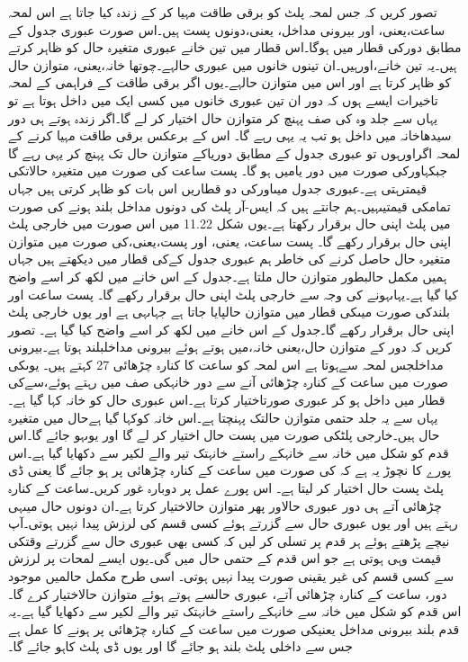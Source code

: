 	تصور کریں کہ جس لمحہ پلٹ کو برقی طاقت مہیا کر کے زندہ کیا جاتا ہے  اس لمحہ  ساعت،یعنی، اور بیرونی مداخل، یعنی،دونوں پست ہیں۔اس صورت عبوری جدول کے مطابق دورکی قطار میں ہوگا۔اس قطار میں تین خانے عبوری متغیرہ حال کو ظاہر کرتے ہیں۔یہ تین خانے،اورہیں۔ان تینوں خانوں میں عبوری حالہے۔چوتھا خانہ،یعنی، متوازن حال کو ظاہر کرتا ہے اور اس میں متوازن حالہے۔یوں اگر برقی طاقت کے فراہمی کے لمحہ تاخیرات ایسے ہوں کہ دور ان تین عبوری خانوں میں کسی ایک میں داخل ہوتا ہے تو یہاں سے جلد وہ کی صف پہنچ کر متوازن حال اختیار کر لے گا۔اگر زندہ ہوتے ہی دور سیدھاخانہ میں داخل ہو تب یہ یہی رہے گا۔
	اس کے برعکس برقی طاقت مہیا کرنے کے لمحہ اگراورہوں تو عبوری جدول کے مطابق دوریاکے متوازن حال تک پہنچ کر یہی رہے گا جبکہاورکی صورت میں دور یامیں ہو گا۔
	پست ساعت کی صورت میں متغیرہ حالاتکی قیمترہتی ہے۔عبوری جدول میںاورکی دو قطاریں اس بات کو ظاہر کرتی ہیں جہاں تمامکی قیمتیںہیں۔ہم جانتے ہیں کہ ایس-آر پلٹ کی دونوں مداخل بلند ہونے کی صورت میں پلٹ اپنی حال برقرار رکھتا ہے۔یوں شکل 11.22 میں اس صورت میں خارجی پلٹ اپنی حال برقرار رکھے گا۔
	پست ساعت، یعنی، اور پست،یعنی،کی صورت میں متوازن متغیرہ حال حاصل کرنے کی خاطر ہم عبوری جدول کےکی قطار میں دیکھتے ہیں جہاں ہمیں مکمل حالبطور متوازن حال ملتا ہے۔جدول کے اس خانے میں لکھ کر اسے واضح کیا گیا ہے۔یہاںہونے کی وجہ سے خارجی پلٹ اپنی حال برقرار رکھے گا۔
	پست ساعت اور بلندکی صورت میںکی قطار میں متوازن حالپایا جاتا ہے جہاںہی ہے اور یوں خارجی پلٹ اپنی حال برقرار رکھے گا۔جدول کے اس خانے میں لکھ کر اسے واضح کیا گیا ہے۔
	تصور کریں کہ دور کے متوازن حال،یعنی خانہ،میں ہوتے ہوئے بیرونی مداخلبلند ہوتا ہے۔بیرونی مداخلجس لمحہ سےہوتا ہے اس لمحہ کو ساعت کا کنارہ چڑھائی 27 کہتے ہیں۔ یوںکی صورت میں ساعت کے کنارہ چڑھائی آنے سے دور خانہکی صف میں رہتے ہوئے،سےکی قطار میں داخل ہو کر عبوری صورتاختیار کرتا ہے۔اس عبوری حال کو خانہ کہا گیا ہے۔یہاں سے یہ جلد حتمی متوازن حالتک پہنچتا ہے۔اس خانہ کوکہا گیا ہےحال میں متغیرہ حال ہیں۔خارجی پلٹکی صورت میں پست حال اختیار کر لے گا اور یوںہو جائے گا۔اس قدم کو شکل میں خانہ سے  خانہکے راستے خانہتک تیر والے لکیر سے دکھایا گیا ہے۔اس پورے کا نچوڑ یہ ہے کہ کی صورت میں ساعت کے کنارہ چڑھائی پر ہو جائے گا یعنی ڈی پلٹ پست حال اختیار کر لیتا ہے۔
	اس پورے عمل پر دوبارہ غور کریں۔ساعت کے کنارہ چڑھائی آتے ہی دور عبوری حالاور پھر متوازن حالاختیار کرتا ہے۔ان دونوں حال میںہی رہتے ہیں اور یوں عبوری حال سے گزرتے ہوئے کسی قسم کی لرزش پیدا نہیں ہوتی۔آپ نیچے پڑھتے ہوئے ہر قدم پر تسلی کر لیں کہ کسی بھی عبوری حال سے گزرتے وقتکی قیمت وہی ہوتی ہے جو اس قدم کے حتمی حال میں گی۔یوں ایسے لمحات پر لرزش سے کسی قسم کی غیر یقینی صورت پیدا نہیں ہوتی۔
		اسی طرح مکمل حالمیں موجود دور، ساعت کے کنارہ چڑھائی آتے، عبوری حالسے ہوتے ہوئے متوازن حالاختیار کرے گا۔اس قدم کو شکل میں خانہ سے  خانہکے راستے خانہتک تیر والے لکیر سے دکھایا گیا ہے۔یہ قدم بلند بیرونی مداخل یعنیکی صورت میں ساعت کے کنارہ چڑھائی پر ہونے کا عمل ہے جس سے داخلی پلٹ بلند ہو جائے گا اور یوں ڈی پلٹ کاہو جائے گا۔
